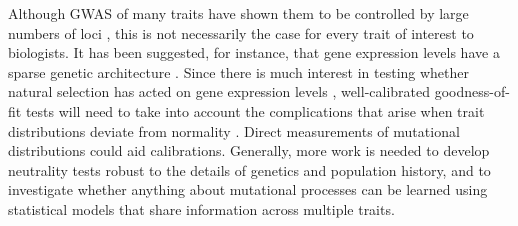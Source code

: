 Although GWAS of many traits have shown them to be controlled by large numbers
of loci \citep{Boyle2017}, this is not necessarily the case for every trait of
interest to biologists. It has been suggested, for instance, that gene
expression levels have a sparse genetic architecture \citep{Wheeler2016}. Since
there is much interest in testing whether natural selection has acted on gene
expression levels \citep{Whitehead2006,Gilad2006,Yang2017}, well-calibrated
goodness-of-fit tests will need to take into account the complications that
arise when trait distributions deviate from normality \citep{Khaitovich2005}.
Direct measurements of mutational distributions \citep{Gruber2012,Metzger2016}
could aid calibrations. Generally, more work is needed to develop neutrality
tests robust to the details of genetics and population history, and to
investigate whether anything about mutational processes can be learned using
statistical models that share information across multiple traits.

